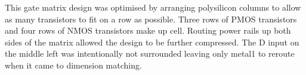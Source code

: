
This gate matrix design was optimised by arranging polysilicon columns to allow as many transistors to fit on a row as possible.
Three rows of PMOS transistors and four rows of NMOS transistors make up cell.
Routing power rails up both sides of the matrix allowed the design to be further compressed.
The D input on the middle left was intentionally not surrounded leaving only metal1 to reroute when it came to dimension matching.


